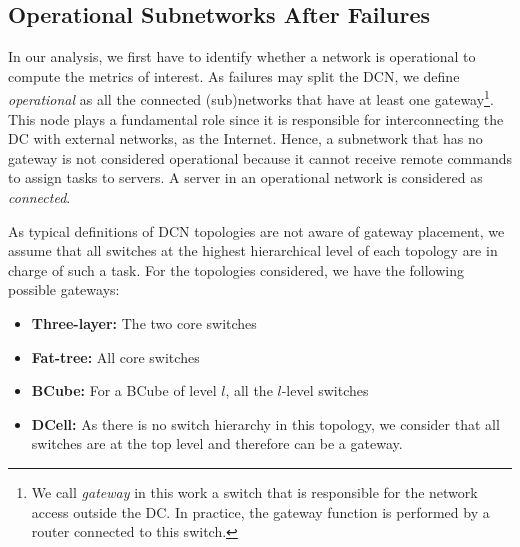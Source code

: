 \subsection{Operational Subnetworks After Failures}
\label{sec:operational}

In our analysis, we first have to identify whether a network is operational to compute the metrics of interest. As failures may split the DCN, we define \textit{operational} as all the connected (sub)networks that have at least one gateway\footnote{We call \textit{gateway} in this work a switch that is responsible for the network access outside the DC. In practice, the gateway function is performed by a router connected to this switch.}. This node plays a fundamental role since it is responsible for interconnecting the DC with external networks, as the Internet. Hence, a subnetwork that has no gateway is not considered operational because it cannot receive remote commands to assign tasks to servers. A server in an operational network is considered as \textit{connected}.

As typical definitions of DCN topologies are not aware of gateway placement, we assume that all switches at the highest hierarchical level of each topology are in charge of such a task. For the topologies considered, we have the following possible gateways:
\begin{itemize}
\item \textbf{Three-layer:} The two core switches
\item \textbf{Fat-tree:} All core switches
\item \textbf{BCube:} For a BCube of level $l$, all the $l$-level switches
\item \textbf{DCell:} As there is no switch hierarchy in this topology, we consider that all switches are at the top level and therefore can be a gateway.
\end{itemize}

